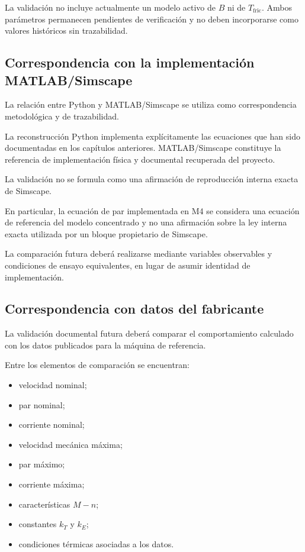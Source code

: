La validación no incluye actualmente un modelo activo de $B$ ni de $T_{\mathrm{fric}}$. Ambos parámetros permanecen pendientes de verificación y no deben incorporarse como valores históricos sin trazabilidad.

\subsection{Correspondencia con la implementación MATLAB/Simscape}

La relación entre Python y MATLAB/Simscape se utiliza como correspondencia metodológica y de trazabilidad.

La reconstrucción Python implementa explícitamente las ecuaciones que han sido documentadas en los capítulos anteriores. MATLAB/Simscape constituye la referencia de implementación física y documental recuperada del proyecto.

La validación no se formula como una afirmación de reproducción interna exacta de Simscape.

En particular, la ecuación de par implementada en M4 se considera una ecuación de referencia del modelo concentrado y no una afirmación sobre la ley interna exacta utilizada por un bloque propietario de Simscape.

La comparación futura deberá realizarse mediante variables observables y condiciones de ensayo equivalentes, en lugar de asumir identidad de implementación.

\subsection{Correspondencia con datos del fabricante}

La validación documental futura deberá comparar el comportamiento calculado con los datos publicados para la máquina de referencia.

Entre los elementos de comparación se encuentran:

\begin{itemize}
    \item velocidad nominal;
    \item par nominal;
    \item corriente nominal;
    \item velocidad mecánica máxima;
    \item par máximo;
    \item corriente máxima;
    \item características $M-n$;
    \item constantes $k_T$ y $k_E$;
    \item condiciones térmicas asociadas a los datos.
\end{itemize}


